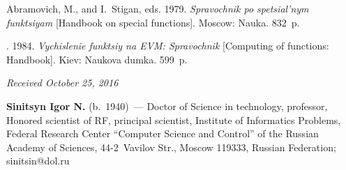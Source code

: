 \begin{multicols}{2}
{{\begin{thebibliography}{9}
Abramovich, M., and I.~Stigan, eds. 1979. \textit{Spravochnik po
spetsial'nym funktsiyam} [Handbook on special functions].
Moscow: Nauka. 832~p.

. 1984. \textit{Vychislenie funk\-tsiy
na EVM: Spravochnik} [Computing of functions: Handbook]. Kiev:
Naukova dumka. 599~p. 
\end{thebibliography}

 }
 }

\end{multicols}

\vspace*{-3pt}

\hfill{\small\textit{Received October 25, 2016}}

\Contrl

\noindent
\textbf{Sinitsyn Igor N.} (b.\ 1940)~---
Doctor of Science in technology, professor, Honored scientist of RF, 
principal scientist, Institute of Informatics Problems, Federal Research Center 
``Computer Science and Control'' of the Russian Academy of Sciences, 44-2~Vavilov 
Str., Moscow 119333, Russian Federation; \mbox{sinitsin@dol.ru}




\label{end\stat}


\renewcommand{\bibname}{\protect\rm Литература} 